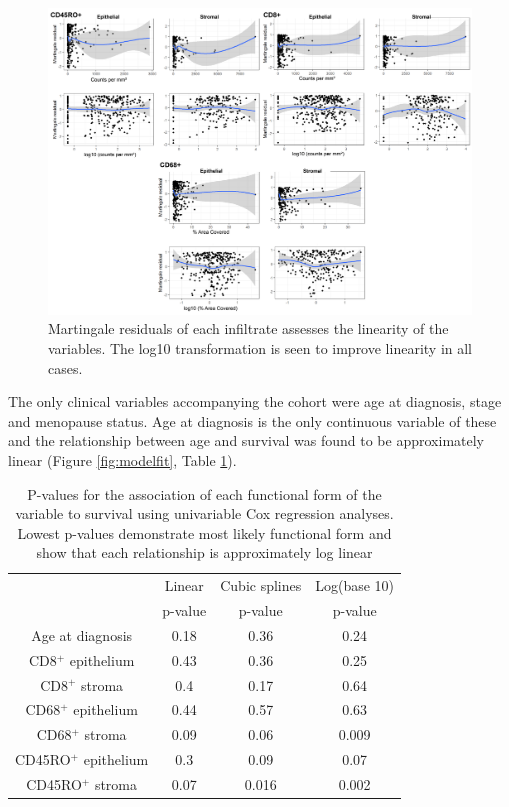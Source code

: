 \begin{figure}
    \centering
    \includegraphics{Chapter2/Figs/Raster/martingale_plots.png}
    \caption{Martingale residuals of each infiltrate assesses the linearity of the variables. The log10 transformation is seen to improve linearity in all cases.}
    \label{fig:martingale}
\end{figure}

The only clinical variables accompanying the cohort were age at diagnosis, stage and menopause status. Age at diagnosis is the only continuous variable of these and the relationship between age and survival was found to be approximately linear (Figure \ref{fig:modelfit}, Table \ref{tab:model_fit}). 

\begin{table}[]
    \centering
    \begin{tabular}{cccc} \hline
        	&	Linear 	&	Cubic splines	&	Log(base 10)	\\
	&	p-value	&	p-value	&	p-value	\\ \hline
Age at diagnosis	&	0.18	&	0.36	&	0.24	\\
CD8$^+$ epithelium	&	0.43	&	0.36	&	0.25	\\
CD8$^+$ stroma	&	0.4	&	0.17	&	0.64	\\
CD68$^+$ epithelium	&	0.44	&	0.57	&	0.63	\\
CD68$^+$ stroma	&	0.09	&	0.06	&	0.009	\\
CD45RO$^+$ epithelium	&	0.3	&	0.09	&	0.07	\\
CD45RO$^+$ stroma	&	0.07	&	0.016	&	0.002	\\
\hline

    \end{tabular}
    \caption{P-values for the association of each functional form of the variable to survival using univariable Cox regression analyses. Lowest p-values demonstrate most likely functional form and show that each relationship is approximately log linear}
    \label{tab:model_fit}
\end{table}


